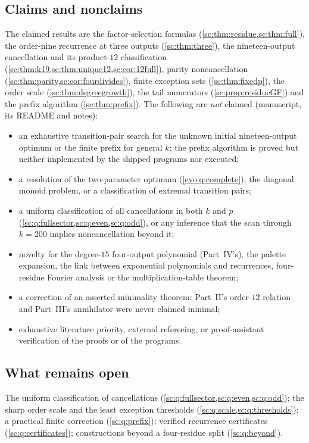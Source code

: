 \documentclass[11pt,a4paper]{article}
\numberwithin{equation}{section}
\theoremstyle{definition}
\theoremstyle{remark}
\begin{document}
\subsection{Claims and nonclaims}
The claimed results are the factor-selection formulas
(\cref{sc:thm:residue,sc:thm:full}), the order-nine recurrence at three
outputs (\cref{sc:thm:three}), the nineteen-output cancellation and its
product-$12$ classification (\cref{sc:thm:k19,sc:thm:unique12,sc:cor:12full}),
parity noncancellation (\cref{sc:thm:parity,sc:cor:fourdivides}), finite
exception sets (\cref{sc:thm:fixedp}), the order scale
(\cref{sc:thm:degreegrowth}), the tail numerators
(\cref{sc:prop:residueGF}) and the prefix algorithm (\cref{sc:thm:prefix}).
The following are \emph{not} claimed (manuscript, its README and notes):
\begin{itemize}
\item an exhaustive transition-pair search for the unknown initial
 nineteen-output optimum or the finite prefix for general $k$; the
 prefix algorithm is proved but neither implemented by the shipped
 programs nor executed;
\item a resolution of the two-parameter optimum (\cref{evo:q:complete}), the
 diagonal monoid problem, or a classification of extremal transition pairs;
\item a uniform classification of all cancellations in both $k$ and $p$
 (\cref{sc:q:fullsector,sc:q:even,sc:q:odd}), or any inference that the
 scan through $k=200$ implies noncancellation beyond it;
\item novelty for the degree-$15$ four-output polynomial (Part~IV's), the
 palette expansion, the link between exponential polynomials and
 recurrences, four-residue Fourier analysis or the multiplication-table
 theorem;
\item a correction of an asserted minimality theorem: Part~II's order-$12$
 relation and Part~III's annihilator were never claimed minimal;
\item exhaustive literature priority, external refereeing, or proof-assistant
 verification of the proofs or of the programs.
\end{itemize}

\subsection{What remains open}
The uniform classification of cancellations
(\cref{sc:q:fullsector,sc:q:even,sc:q:odd}); the sharp order scale and the
least exception thresholds (\cref{sc:q:scale,sc:q:thresholds}); a practical
finite correction (\cref{sc:q:prefix}); verified recurrence certificates
(\cref{sc:q:certificates}); constructions beyond a four-residue split
(\cref{sc:q:beyond}).
\end{document}
